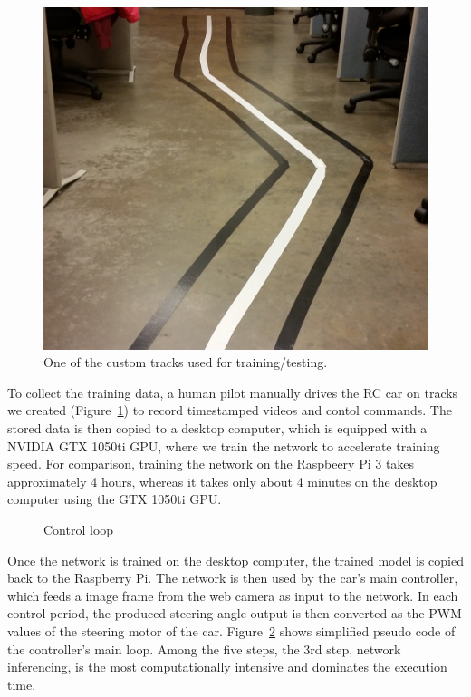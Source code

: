 \begin{figure}[h]
  \centering
  \includegraphics[width=.5\textwidth]{figs/track_new2}
  \caption{One of the custom tracks used for training/testing.}
  \label{fig:track}
\end{figure}

To collect the training data, a human pilot manually drives the RC car
on tracks we created (Figure~\ref{fig:track}) to record
timestamped videos and contol commands. The stored data is then copied 
to a desktop computer, which is equipped with a NVIDIA GTX 1050ti GPU, 
where we train the network to accelerate training speed. 
For comparison, training the network on the Raspbeery Pi 3 takes
approximately 4 hours, whereas it takes only about 4 minutes on the
desktop computer using the GTX 1050ti GPU.

\begin{figure}[h]
  
  \caption{Control loop}
  \label{fig:controlloop}
\end{figure}

Once the network is trained on the desktop computer, the trained model
is copied back to the Raspberry Pi. The network is then used
by the car's main controller, which feeds a image frame from the web
camera as input to the network. In each control period, the produced 
steering angle output is then converted as the PWM values of the 
steering motor of the car. Figure~\ref{fig:controlloop} shows simplified 
pseudo code of the controller's main loop. Among the five steps, the 3rd step, 
network inferencing, is the most computationally intensive and dominates the
execution time.

